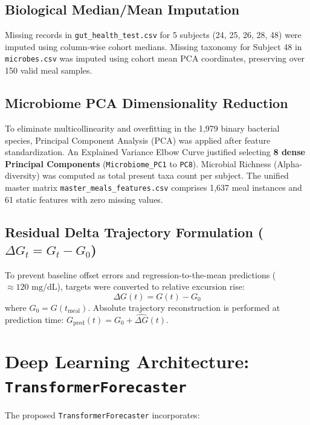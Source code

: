 \documentclass[11pt,a4paper]{article}
\begin{document}
\subsection{Biological Median/Mean Imputation}
Missing records in \texttt{gut\_health\_test.csv} for 5 subjects (24, 25, 26, 28, 48) were imputed using column-wise cohort medians. Missing taxonomy for Subject 48 in \texttt{microbes.csv} was imputed using cohort mean PCA coordinates, preserving over 150 valid meal samples.

\subsection{Microbiome PCA Dimensionality Reduction}
To eliminate multicollinearity and overfitting in the 1,979 binary bacterial species, Principal Component Analysis (PCA) was applied after feature standardization. An Explained Variance Elbow Curve justified selecting \textbf{8 dense Principal Components} (\texttt{Microbiome\_PC1} to \texttt{PC8}). Microbial Richness (Alpha-diversity) was computed as total present taxa count per subject. The unified master matrix \texttt{master\_meals\_features.csv} comprises 1,637 meal instances and 61 static features with zero missing values.

\subsection{Residual Delta Trajectory Formulation ($\Delta G_t = G_t - G_0$)}
To prevent baseline offset errors and regression-to-the-mean predictions ($\approx 120\text{ mg/dL}$), targets were converted to relative excursion rise:
\begin{equation}
    \Delta G(t) = G(t) - G_0
\end{equation}
where $G_0 = G(t_{\text{meal}})$. Absolute trajectory reconstruction is performed at prediction time: $G_{\text{pred}}(t) = G_0 + \hat{\Delta G}(t)$.

\section{Deep Learning Architecture: \texttt{TransformerForecaster}}
The proposed \texttt{TransformerForecaster} incorporates:
\end{document}
